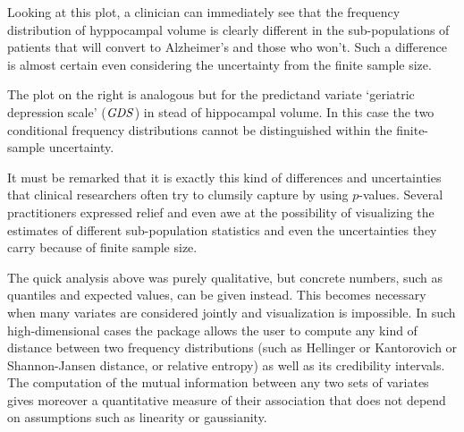 Looking at this plot, a clinician can immediately see that the frequency distribution of hyppocampal volume is clearly different in the sub-populations of patients that will convert to Alzheimer's and those who won't. Such a difference is almost certain even considering the uncertainty from the finite sample size.

The plot on the right is analogous but for the predictand variate `geriatric depression scale' ($\mathit{GDS}$) in stead of hippocampal volume. In this case the two conditional frequency distributions cannot be distinguished within the finite-sample uncertainty.

It must be remarked that it is exactly this kind of differences and uncertainties that clinical researchers often try to clumsily capture by using $p$-values. Several practitioners expressed relief and even awe at the possibility of visualizing the estimates of different sub-population statistics and even the uncertainties they carry because of finite sample size.

The quick analysis above was purely qualitative, but concrete numbers, such as quantiles and expected values, can be given instead. This becomes necessary when many variates are considered jointly and visualization is impossible. In such high-dimensional cases the package allows the user to compute any kind of distance between two frequency distributions (such as Hellinger or Kantorovich or Shannon-Jansen distance, or relative entropy) as well as its credibility intervals. The computation of the mutual information between any two sets of variates gives moreover a quantitative measure of their association that does not depend on assumptions such as linearity or gaussianity.

\medskip

